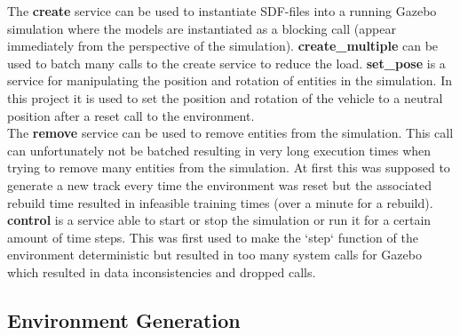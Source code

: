 The \textbf{create} service can be used to instantiate SDF-files into a running Gazebo simulation where the models are instantiated as a blocking call (appear immediately from the perspective of the simulation). \textbf{create\_multiple} can be used to batch many calls to the create service to reduce the load. \textbf{set\_pose} is a service for manipulating the position and rotation of entities in the simulation. In this project it is used to set the position and rotation of the vehicle to a neutral position after a reset call to the environment.\\
The \textbf{remove} service can be used to remove entities from the simulation. This call can unfortunately not be batched resulting in very long execution times when trying to remove many entities from the simulation. At first this was supposed to generate a new track every time the environment was reset but the associated rebuild time resulted in infeasible training times (over a minute for a rebuild).\\
\textbf{control} is a service able to start or stop the simulation or run it for a certain amount of time steps. This was first used to make the `step` function of the environment deterministic but resulted in too many system calls for Gazebo which resulted in data inconsistencies and dropped calls.

\subsection{Environment Generation}


